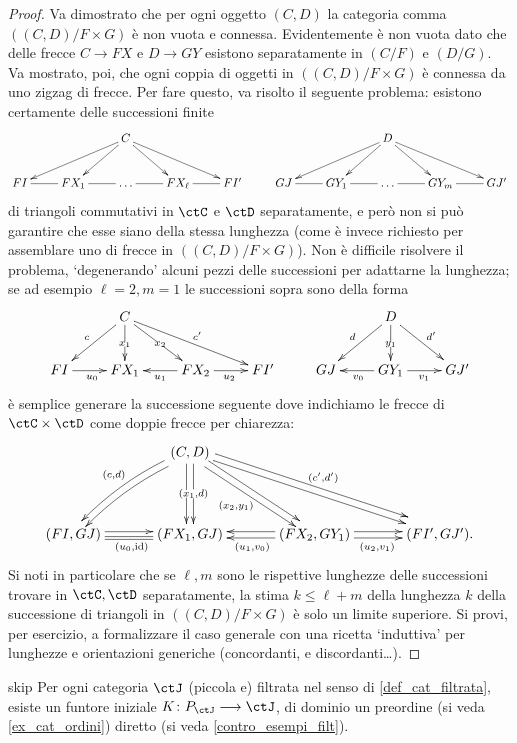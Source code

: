 \begin{proof}
 Va dimostrato che per ogni oggetto \((C,D)\) la categoria comma \(((C,D)/F\times G)\) è non vuota e connessa. Evidentemente è non vuota dato che delle frecce \(C\to FX\) e \(D\to GY\) esistono separatamente in \((C/F)\) e \((D/G)\). Va mostrato, poi, che ogni coppia di oggetti in \(((C,D)/F\times G)\) è connessa da uno zigzag di frecce. Per fare questo, va risolto il seguente problema: esistono certamente delle successioni finite
 \[\xymatrix@C=8mm{
  &&C\ar[dr]\ar[dl]\ar[dll]\ar[drr] &&&&& D\ar[dr]\ar[dl]\ar[dll]\ar[drr]\\
  FI\ar@{-}[r] & FX_1\ar@{-}[r] & \dots\ar@{-}[r] & FX_\ell\ar@{-}[r] & FI' & GJ\ar@{-}[r] & GY_1\ar@{-}[r] & \dots\ar@{-}[r] & GY_m\ar@{-}[r] & GJ'
  }
 \]
 di triangoli commutativi in \(\ctC\) e \(\ctD\) separatamente, e però non si può garantire che esse siano della stessa lunghezza (come è invece richiesto per assemblare uno \zzg di frecce in \(((C,D)/F\times G)\)). Non è difficile risolvere il problema, `degenerando' alcuni pezzi delle successioni per adattarne la lunghezza; se ad esempio \(\ell=2,m=1\) le successioni sopra sono della forma
 \[\xymatrix{
  &C\ar[dr]|{x_2}\ar[dl]_{c}\ar[d]|{x_1}\ar[drr]^{c'} &&&& D\ar[d]|{y_1}\ar[dr]^{d'}\ar[dl]_d \\
  FI\ar@{->}[r]_{u_0} & FX_1\ar@{<-}[r]_{u_1} & FX_2\ar@{->}[r]_{u_2} & FI' &
  GJ\ar@{<-}[r]_{v_0} & GY_1 \ar@{->}[r]_{v_1} & GJ'
  }\]
 è semplice generare la successione seguente dove indichiamo le frecce di \(\ctC\times\ctD\) come doppie frecce per chiarezza:
 \[\xymatrix@C=1.2cm@R=1.5cm{
  &(C,D)\ar@/_.5pc/@<.25em>[dl]\ar@/_.5pc/@<-.25em>[dl]_{(c,d)}\ar@<-.25em>[d]|\hole\ar@<.25em>[d]|{(x_1,d)}\ar@<-.25em>[dr]_{(x_2,y_1)}\ar@<.25em>[dr]\ar[drr]\ar@<.5em>[drr]^{(c',d')}\\
  (FI,GJ)\ar@<.225em>[r]\ar@<-.225em>@{=}[r]_{(u_0,\id)} & (FX_1,GJ) & (FX_2,GY_1)\ar@<.225em>[l]^{(u_1,v_0)}\ar@<-.225em>[l] \ar@<.225em>[r]\ar@<-.225em>[r]_{(u_2,v_1)} & (FI',GJ').
  }
 \]
 Si noti in particolare che se \(\ell,m\) sono le rispettive lunghezze delle successioni trovare in \(\ctC,\ctD\) separatamente, la stima \(k\le \ell+m\) della lunghezza \(k\)	della successione di triangoli in \(((C,D)/F\times G)\) è solo un limite superiore. Si provi, per esercizio, a formalizzare il caso generale con una ricetta `induttiva' per lunghezze e orientazioni generiche (concordanti, e discordanti\dots).
\end{proof}
\begin{hTheorem}{skip}
 Per ogni categoria \(\ctJ\) (piccola e) filtrata nel senso di \ref{def_cat_filtrata}, esiste un funtore iniziale \(K \colon P_\ctJ\fun\ctJ\), di dominio un preordine (si veda \ref{ex_cat_ordini}) diretto (si veda \ref{contro_esempi_filt}).
\end{hTheorem}
